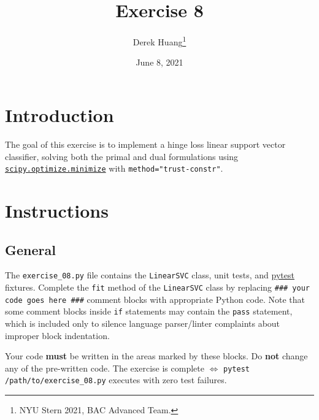 \documentclass{article}
\title{Exercise 8}
\author{Derek Huang\thanks{NYU Stern 2021, BAC Advanced Team.}}
\date{June 8, 2021}
\numberwithin{equation}{section}
\newcommand{\pytest}{\href{https://docs.pytest.org/en/stable/}{pytest}}
\newcommand{\minimize}{%
    \href{%
        https://docs.scipy.org/doc/scipy/reference/generated/%
        scipy.optimize.minimize.html%
    }{\texttt{scipy.optimize.minimize}}%
}
\begin{document}
\maketitle
\thispagestyle{fancy}


\section{Introduction}

The goal of this exercise is to implement a hinge loss linear support vector classifier, solving both the primal and dual formulations using \minimize{} with \texttt{method="trust-constr"}.

\section{Instructions}

\subsection{General}

The \texttt{exercise\_08.py} file contains the \texttt{LinearSVC} class, unit
tests, and \pytest{} fixtures. Complete the \texttt{fit} method of the 
\texttt{LinearSVC} class by replacing
\texttt{\#\#\# your code goes here \#\#\#} comment blocks with appropriate
Python code. Note that some comment blocks inside \texttt{if} statements may
contain the \texttt{pass} statement, which is included only to silence
language parser/linter complaints about improper block indentation.

\medskip

Your code \textbf{must} be written in the areas marked by these blocks. Do
\textbf{not} change any of the pre-written code. The exercise is complete
$ \Leftrightarrow $ \texttt{pytest /path/to/exercise\_08.py} executes with
zero test failures.

\end{document}
